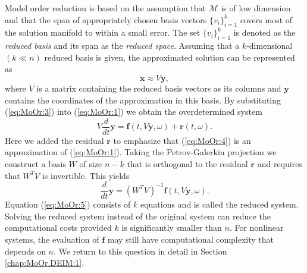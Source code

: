 Model order reduction is based on the assumption that $\mathcal M$ is of low dimension \cite{Anonymous:2016wl,Antoulas:2005:ALD:1088857} and that the span of appropriately chosen basis vectors $\{v_i\}_{i=1}^k$ covers most of the solution manifold {\edit to within} a small error. The set $\{v_i\}_{i=1}^k$ is denoted as the \emph{reduced basis} and its span as the \emph{reduced space}. Assuming that a $k$-dimensional $(k\ll n)$ reduced basis is given, the approximated solution can be represented as
\begin{equation} \label{eq:MoOr:3}
	\mathbf x \approx V \mathbf y,
\end{equation}
where $V$ is a matrix containing the reduced basis vectors as its columns and $\mathbf y$ {\edit contains} the coordinates of the approximation in this basis. By substituting (\ref{eq:MoOr:3}) into (\ref{eq:MoOr:1}) we obtain the overdetermined system
\begin{equation} \label{eq:MoOr:4}
	V \frac{d}{dt} \mathbf y = \mathbf f (t , V \mathbf y , \omega) + \mathbf r(t,\omega).
\end{equation}
Here we added the residual $\mathbf r$ to emphasize that (\ref{eq:MoOr:4}) is an approximation of (\ref{eq:MoOr:1}). Taking the Petrov-Galerkin projection \cite{Antoulas:2005:ALD:1088857} we construct a basis $W$ of size $n-k$ that is orthogonal to the residual $\mathbf r$ and {\edit requires that} $W^T V$ is invertible. This yields
\begin{equation} \label{eq:MoOr:5}
	\frac{d}{dt} \mathbf y = (W^TV)^{-1} \mathbf f(t,V\mathbf y,\omega).
\end{equation}
Equation (\ref{eq:MoOr:5}) consists of $k$ equations and is called the reduced system. Solving the reduced system instead of the original system can reduce the computational costs {\edit provided} $k$ is significantly smaller than $n$. For nonlinear systems, the evaluation of $\mathbf f$ may still have computational complexity that depends on $n$. We return to this question in detail in Section \ref{chap:MoOr.DEIM:1}.

